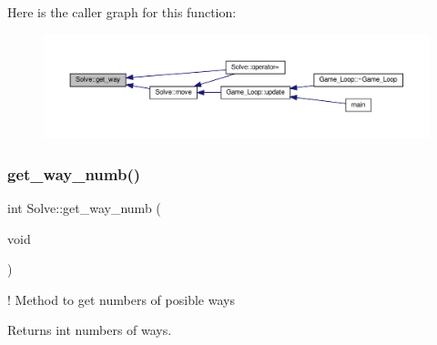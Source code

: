 Here is the caller graph for this function\+:\nopagebreak
\begin{figure}[H]
\begin{center}
\leavevmode
\includegraphics[width=350pt]{classSolve_a963b593c0311f03c7e4ce77eea818fa1_icgraph}
\end{center}
\end{figure}
\mbox{\label{classSolve_aaccff68d3e175f7400a9407077db7255}} 
\subsubsection{\texorpdfstring{get\+\_\+way\+\_\+numb()}{get\_way\_numb()}}
{\footnotesize\ttfamily int Solve\+::get\+\_\+way\+\_\+numb (\begin{DoxyParamCaption}\item[{void}]{ }\end{DoxyParamCaption})}



! Method to get numbers of posible ways 

\begin{DoxyReturn}{Returns}
int numbers of ways. 
\end{DoxyReturn}

